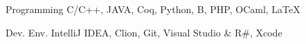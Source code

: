 

\begin{cvskills}

  \cvskill
    {Programming} %
    {C/C++, JAVA, Coq, Python, B, PHP, OCaml, \LaTeX} %

  \cvskill
    {Dev. Env.} %
    {IntelliJ IDEA, Clion, Git, Visual Studio \& R\#, Xcode} %

\end{cvskills}
